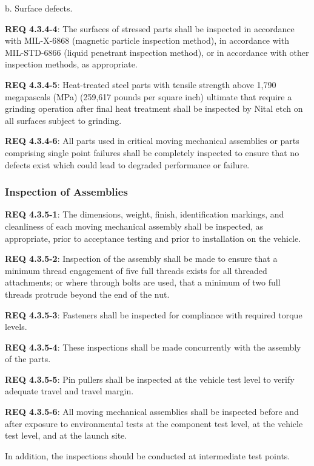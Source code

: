 \documentclass[12pt]{article}
\begin{document}
b. Surface defects. 

\noindent \textbf{REQ 4.3.4-4}: The surfaces of stressed parts shall be inspected in accordance with MIL-X-6868 (magnetic particle inspection method), in accordance with MIL-STD-6866 (liquid penetrant inspection method), or in accordance with other inspection methods, as appropriate. 

\noindent \textbf{REQ 4.3.4-5}: Heat-treated steel parts with tensile strength above 1,790 megapascals (MPa) (259,617 pounds per square inch) ultimate that require a grinding operation after final heat treatment shall be inspected by Nital etch on all surfaces subject to grinding.

\noindent \textbf{REQ 4.3.4-6}: All parts used in critical moving mechanical assemblies or parts comprising single point failures shall be completely inspected to ensure that no defects exist which could lead to degraded performance or failure.


\subsubsection{Inspection of Assemblies} %
\noindent \textbf{REQ 4.3.5-1}: The dimensions, weight, finish, identification markings, and cleanliness of each moving mechanical assembly shall be inspected, as appropriate, prior to acceptance testing and prior to installation on the vehicle.

\noindent \textbf{REQ 4.3.5-2}: Inspection of the assembly shall be made to ensure that a minimum thread engagement of five full threads exists for all threaded attachments; or where through bolts are used, that a minimum of two full threads protrude beyond the end of the nut.

\noindent \textbf{REQ 4.3.5-3}: Fasteners shall be inspected for compliance with required torque levels. 

\noindent \textbf{REQ 4.3.5-4}: These inspections shall be made concurrently with the assembly of the parts. 

\noindent \textbf{REQ 4.3.5-5}: Pin pullers shall be inspected at the vehicle test level to verify adequate travel and travel margin.

\noindent \textbf{REQ 4.3.5-6}: All moving mechanical assemblies shall be inspected before and after exposure to environmental tests at the component test level, at the vehicle test level, and at the launch site. 

In addition, the inspections should be conducted at intermediate test points. 
\end{document}
